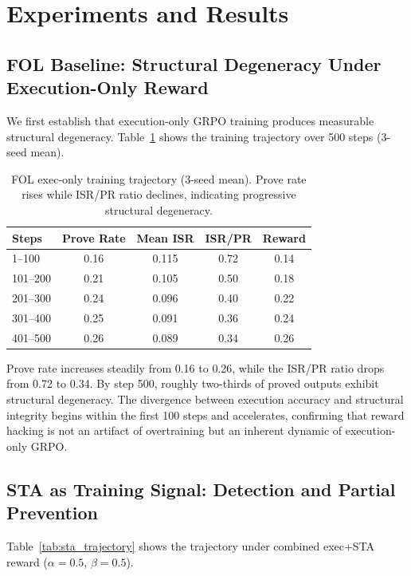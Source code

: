 \documentclass[11pt,a4paper]{article}
\begin{document}
\section{Experiments and Results}

\subsection{FOL Baseline: Structural Degeneracy Under Execution-Only Reward}

We first establish that execution-only GRPO training produces measurable structural degeneracy.
Table~\ref{tab:fol_trajectory} shows the training trajectory over 500 steps (3-seed mean).

\begin{table}[t]
\centering
\small
\caption{FOL exec-only training trajectory (3-seed mean). Prove rate rises while ISR/PR ratio declines, indicating progressive structural degeneracy.}
\label{tab:fol_trajectory}
\begin{tabular}{lcccc}
\toprule
Steps & Prove Rate & Mean ISR & ISR/PR & Reward \\
\midrule
1--100   & 0.16 & 0.115 & 0.72 & 0.14 \\
101--200 & 0.21 & 0.105 & 0.50 & 0.18 \\
201--300 & 0.24 & 0.096 & 0.40 & 0.22 \\
301--400 & 0.25 & 0.091 & 0.36 & 0.24 \\
401--500 & 0.26 & 0.089 & 0.34 & 0.26 \\
\bottomrule
\end{tabular}
\end{table}

Prove rate increases steadily from 0.16 to 0.26, while the ISR/PR ratio drops from 0.72 to 0.34.
By step 500, roughly two-thirds of proved outputs exhibit structural degeneracy.
The divergence between execution accuracy and structural integrity begins within the first 100 steps and accelerates, confirming that reward hacking is not an artifact of overtraining but an inherent dynamic of execution-only GRPO.

\subsection{STA as Training Signal: Detection and Partial Prevention}

Table~\ref{tab:sta_trajectory} shows the trajectory under combined exec+STA reward ($\alpha=0.5$, $\beta=0.5$).
\end{document}
